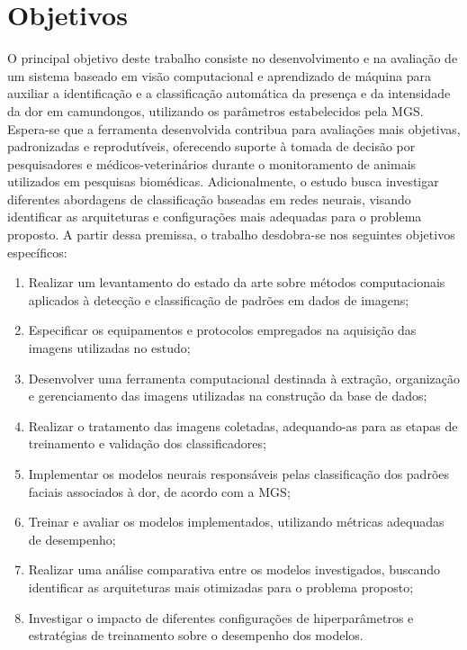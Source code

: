 \section{Objetivos}

O principal objetivo deste trabalho consiste no desenvolvimento e na avaliação de um sistema baseado em visão computacional e aprendizado de máquina para auxiliar a identificação e a classificação automática da presença e da intensidade da dor em camundongos, utilizando os parâmetros estabelecidos pela \acs{MGS}. Espera-se que a ferramenta desenvolvida contribua para avaliações mais objetivas, padronizadas e reprodutíveis, oferecendo suporte à tomada de decisão por pesquisadores e médicos-veterinários durante o monitoramento de animais utilizados em pesquisas biomédicas. Adicionalmente, o estudo busca investigar diferentes abordagens de classificação baseadas em redes neurais, visando identificar as arquiteturas e configurações mais adequadas para o problema proposto. A partir dessa premissa, o trabalho desdobra-se nos seguintes objetivos específicos:

\begin{enumerate}
	
	\item Realizar um levantamento do estado da arte sobre métodos computacionais aplicados à detecção e classificação de padrões em dados de imagens;
	
	\item Especificar os equipamentos e protocolos empregados na aquisição das imagens utilizadas no estudo;
	
    \item Desenvolver uma ferramenta computacional destinada à extração, organização e gerenciamento das imagens utilizadas na construção da base de dados;
    
    \item Realizar o tratamento das imagens coletadas, adequando-as para as etapas de treinamento e validação dos classificadores;

	\item Implementar os modelos neurais responsáveis pelas classificação dos padrões faciais associados à dor, de acordo com a \acs{MGS};
	
	\item Treinar e avaliar os modelos implementados, utilizando métricas adequadas de desempenho;
	
	\item Realizar uma análise comparativa entre os modelos investigados, buscando identificar as arquiteturas mais otimizadas para o problema proposto;
	
	\item Investigar o impacto de diferentes configurações de hiperparâmetros e estratégias de treinamento sobre o desempenho dos modelos.
	
    
\end{enumerate}

